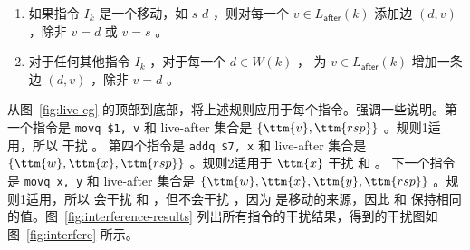 \documentclass[11pt]{book}
\begin{document}
\begin{enumerate}
\item 如果指令 $I_k$ 是一个移动，如  $s$\key{,}
  $d$ ，则对每一个 $v \in
  L_{\mathsf{after}}(k)$ 添加边 $(d,v)$ ，除非 $v = d$ 或 $v = s$ 。

\item 对于任何其他指令 $I_k$ ，对于每一个 $d \in W(k)$ ，
  为 $v \in L_{\mathsf{after}}(k)$ 增加一条边 $(d,v)$ ，除非 $v = d$ 。
  

\end{enumerate}

从图~\ref{fig:live-eg} 的顶部到底部，将上述规则应用于每个指令。强调一些说明。第一个指令是 \lstinline{movq $1, v} 和
live-after 集合是 $\{\ttm{v},\ttm{rsp}\}$ 。规则1适用，所以 
干扰  。
%
第四个指令是 \lstinline{addq $7, x} 和 live-after
集合是 $\{\ttm{w},\ttm{x},\ttm{rsp}\}$ 。规则2适用于 $\ttm{x}$
干扰  和  。
%
下一个指令是 \lstinline{movq x, y} 和 live-after 集合是 $\{\ttm{w},\ttm{x},\ttm{y},\ttm{rsp}\}$ 。规则1适用，所以 
会干扰  和  ，但不会干扰  ，因为 
是移动的来源，因此  和  保持相同的值。图~\ref{fig:interference-results} 列出所有指令的干扰结果，得到的干扰图如图~\ref{fig:interfere} 所示。
\end{document}
